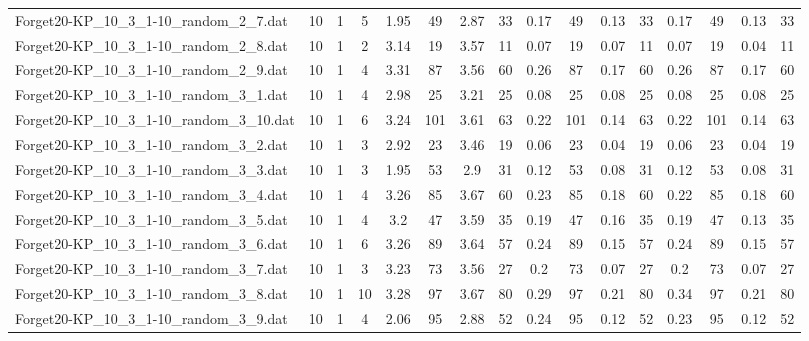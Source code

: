\begin{sidewaystable}[!ht]
{\begin{tabular}{lccccccccccccccc}
Forget20-KP\_10\_3\_1-10\_random\_2\_7.dat & 10 & 1 & 5 & 1.95 & 49 & 2.87 & 33 & 0.17 & 49 &  \textcolor{blue2}{0.13} & 33 & 0.17 & 49 &  \textcolor{blue2}{0.13} & 33 \\
Forget20-KP\_10\_3\_1-10\_random\_2\_8.dat & 10 & 1 & 2 & 3.14 & 19 & 3.57 & 11 & 0.07 & 19 & 0.07 & 11 & 0.07 & 19 &  \textcolor{blue2}{0.04} & 11 \\
Forget20-KP\_10\_3\_1-10\_random\_2\_9.dat & 10 & 1 & 4 & 3.31 & 87 & 3.56 & 60 & 0.26 & 87 &  \textcolor{blue2}{0.17} & 60 & 0.26 & 87 &  \textcolor{blue2}{0.17} & 60 \\
Forget20-KP\_10\_3\_1-10\_random\_3\_1.dat & 10 & 1 & 4 & 2.98 & 25 & 3.21 & 25 &  \textcolor{blue2}{0.08} & 25 &  \textcolor{blue2}{0.08} & 25 &  \textcolor{blue2}{0.08} & 25 &  \textcolor{blue2}{0.08} & 25 \\
Forget20-KP\_10\_3\_1-10\_random\_3\_10.dat & 10 & 1 & 6 & 3.24 & 101 & 3.61 & 63 & 0.22 & 101 &  \textcolor{blue2}{0.14} & 63 & 0.22 & 101 &  \textcolor{blue2}{0.14} & 63 \\
Forget20-KP\_10\_3\_1-10\_random\_3\_2.dat & 10 & 1 & 3 & 2.92 & 23 & 3.46 & 19 & 0.06 & 23 &  \textcolor{blue2}{0.04} & 19 & 0.06 & 23 &  \textcolor{blue2}{0.04} & 19 \\
Forget20-KP\_10\_3\_1-10\_random\_3\_3.dat & 10 & 1 & 3 & 1.95 & 53 & 2.9 & 31 & 0.12 & 53 &  \textcolor{blue2}{0.08} & 31 & 0.12 & 53 &  \textcolor{blue2}{0.08} & 31 \\
Forget20-KP\_10\_3\_1-10\_random\_3\_4.dat & 10 & 1 & 4 & 3.26 & 85 & 3.67 & 60 & 0.23 & 85 &  \textcolor{blue2}{0.18} & 60 & 0.22 & 85 &  \textcolor{blue2}{0.18} & 60 \\
Forget20-KP\_10\_3\_1-10\_random\_3\_5.dat & 10 & 1 & 4 & 3.2 & 47 & 3.59 & 35 & 0.19 & 47 & 0.16 & 35 & 0.19 & 47 &  \textcolor{blue2}{0.13} & 35 \\
Forget20-KP\_10\_3\_1-10\_random\_3\_6.dat & 10 & 1 & 6 & 3.26 & 89 & 3.64 & 57 & 0.24 & 89 &  \textcolor{blue2}{0.15} & 57 & 0.24 & 89 &  \textcolor{blue2}{0.15} & 57 \\
Forget20-KP\_10\_3\_1-10\_random\_3\_7.dat & 10 & 1 & 3 & 3.23 & 73 & 3.56 & 27 & 0.2 & 73 &  \textcolor{blue2}{0.07} & 27 & 0.2 & 73 &  \textcolor{blue2}{0.07} & 27 \\
Forget20-KP\_10\_3\_1-10\_random\_3\_8.dat & 10 & 1 & 10 & 3.28 & 97 & 3.67 & 80 & 0.29 & 97 &  \textcolor{blue2}{0.21} & 80 & 0.34 & 97 &  \textcolor{blue2}{0.21} & 80 \\
Forget20-KP\_10\_3\_1-10\_random\_3\_9.dat & 10 & 1 & 4 & 2.06 & 95 & 2.88 & 52 & 0.24 & 95 &  \textcolor{blue2}{0.12} & 52 & 0.23 & 95 &  \textcolor{blue2}{0.12} & 52 \\

\end{tabular}}
\end{sidewaystable}
